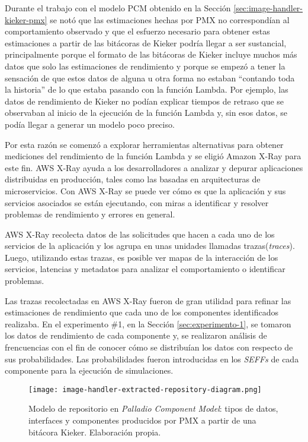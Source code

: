 Durante el trabajo con el modelo PCM obtenido en la Sección \ref{sec:image-handler-kieker-pmx} se notó que las estimaciones hechas por PMX no correspondían al comportamiento observado y que el esfuerzo necesario para obtener estas estimaciones a partir de las bitácoras de Kieker podría llegar a ser sustancial, principalmente porque el formato de las bitácoras de Kieker incluye muchos más datos que solo las estimaciones de rendimiento y porque se empezó a tener la sensación de que estos datos de alguna u otra forma no estaban ``contando toda la historia'' de lo que estaba pasando con la función Lambda. Por ejemplo, las datos de rendimiento de Kieker no podían explicar tiempos de retraso que se observaban al inicio de la ejecución de la función Lambda y, sin esos datos, se podía llegar a generar un modelo poco preciso.

Por esta razón se comenzó a explorar herramientas alternativas para obtener mediciones del rendimiento de la función Lambda y se eligió Amazon X-Ray para este fin. AWS X-Ray ayuda a los desarrolladores a analizar y depurar aplicaciones distribuidas en producción, tales como las basadas en arquitecturas de microservicios. Con AWS X-Ray se puede ver cómo es que la aplicación y sus servicios asociados se están ejecutando, con miras a identificar y resolver problemas de rendimiento y errores en general.

AWS X-Ray recolecta datos de las solicitudes que hacen a cada uno de los servicios de la aplicación y los agrupa en unas unidades llamadas trazas(\emph{traces}). Luego, utilizando estas trazas, es posible ver mapas de la interacción de los servicios, latencias y metadatos para analizar el comportamiento o identificar problemas.


Las trazas recolectadas en AWS X-Ray fueron de gran utilidad para refinar las estimaciones de rendimiento que cada uno de los componentes identificados realizaba. En el experimento \#1, en la Sección \ref{sec:experimento-1}, se tomaron los datos de rendimiento de cada componente y, se realizaron análisis de frencuencias con el fin de conocer cómo se distribuían los datos con respecto de sus probabilidades. Las probabilidades fueron introducidas en los \emph{SEFFs} de cada componente para la ejecución de simulaciones.   



\eject \pdfpagewidth=28in \pdfpageheight=23in
\begin{landscape}
\thispagestyle{empty}
\begin{figure}[htb]
  \vspace*{3cm} 
  \hspace{-33cm} 
  \centering
  \texttt{[image: image-handler-extracted-repository-diagram.png]}
  \caption[\hspace{0.2cm} Modelo de repositorio en \emph{Palladio Component Model}]{Modelo de repositorio en \emph{Palladio Component Model}: tipos de datos, interfaces y componentes producidos por PMX a partir de una bitácora Kieker. Elaboración propia.}
  \label{fig:image-handler-pcm-model}
\end{figure}
\end{landscape}




